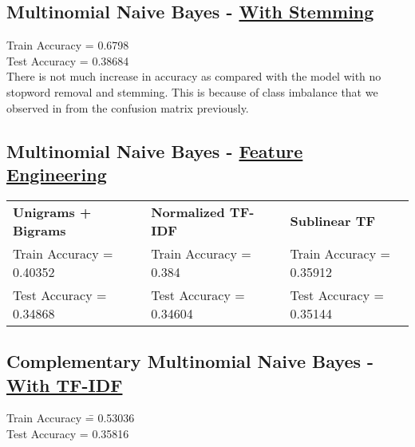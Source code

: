 \documentclass[12pt]{article}
\begin{document}
\subsection*{Multinomial Naive Bayes - \underline{With Stemming}}
\begin{addmargin}[0.3in]{0in}
Train Accuracy = 0.6798\\
Test Accuracy = 0.38684\\
There is not much increase in accuracy as compared with the model with no stopword removal and stemming. This is because of class imbalance that we observed in from the confusion matrix previously.
\end{addmargin}
\subsection*{Multinomial Naive Bayes - \underline{Feature Engineering}}
\begin{addmargin}[0.3in]{0in}
\begin{tabular}{lclcl}
\textbf{Unigrams + Bigrams}           & \hspace{10mm} & \textbf{Normalized TF-IDF}            & \hspace{10mm} & \textbf{Sublinear TF} \\
Train Accuracy = 0.40352              & \hspace{10mm} & Train Accuracy = 0.384                & \hspace{10mm} & Train Accuracy = 0.35912 \\
Test Accuracy \hspace{2pt}  = 0.34868 & \hspace{10mm} & Test Accuracy \hspace{2pt} = 0.34604  & \hspace{10mm} & Test Accuracy \hspace{2pt}  = 0.35144
\end{tabular}
\end{addmargin}
\subsection*{Complementary Multinomial Naive Bayes - \underline{With TF-IDF}}
\begin{addmargin}[0.3in]{0in}
\begin{tabbing}
Train Accuracy \= = 0.53036\\
Test Accuracy \> = 0.35816
\end{tabbing}
\end{addmargin}
\end{document}
